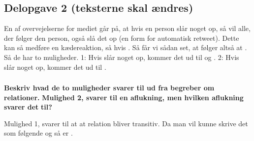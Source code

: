 \documentclass{article}
\begin{document}
\subsection{\textbf{Delopgave 2 (teksterne skal ændres)}}
\begin{Maple Normal}{
En af overvejelserne for mediet går på, at hvis en person slår noget op, så vil\linebreak
alle, der følger den person, også slå det op (en form for automatisk retweet).\linebreak
Dette kan så medføre en kædereaktion, så hvis 
. Så får vi sådan set, at 
 følger 
 altså at 
. Så de har to muligheder. 1: Hvis 
 slår noget op, kommer det ud til 
 og 
. 2: Hvis 
 slår noget op, kommer det ud til 
.}\end{Maple Normal}

\begin{Maple Normal}{
}\end{Maple Normal}
\subsubsection{
}
\begin{Maple Normal}{
\textbf{Beskriv hvad de to muligheder svarer til ud fra begreber om relationer.\linebreak
}\textbf{Mulighed 2, svarer til en aﬂukning, men hvilken aﬂukning svarer det\linebreak
}\textbf{til?}}\end{Maple Normal}

\begin{Maple Normal}{
}\end{Maple Normal}
\begin{Maple Normal}{
Mulighed 1, svarer til at at relation bliver transitiv. Da man vil kunne skrive det som følgende 
 og 
 så er 
.}\end{Maple Normal}
\end{document}
